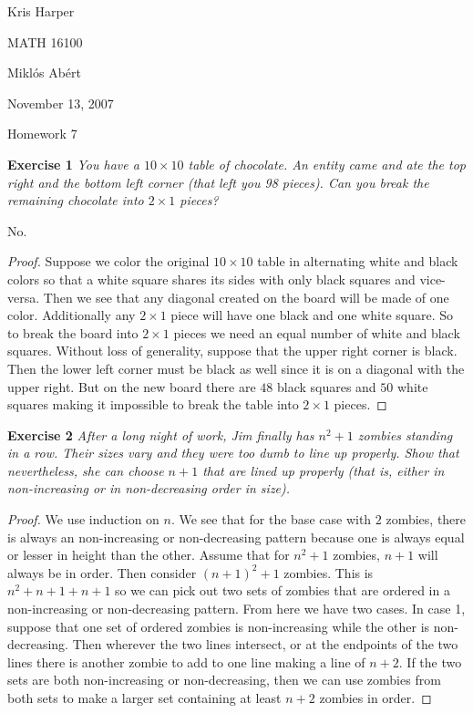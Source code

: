 \documentclass{article}
\begin{document}
\begin{flushright}
Kris Harper

MATH 16100

Mikl\'{o}s Ab\'{e}rt

November 13, 2007
\end{flushright}

\begin{center}
Homework 7
\end{center}

\begin{flushleft}

\textbf{Exercise 1}
\textsl{You have a $10 \times 10$ table of chocolate. An entity came and ate the top right and the bottom left corner (that left you 98 pieces). Can you break the remaining chocolate into $2 \times 1$ pieces?}\newline

No.
\begin{proof}
Suppose we color the original $10 \times 10$ table in alternating white and black colors so that a white square shares its sides with only black squares and vice-versa. Then we see that any diagonal created on the board will be made of one color. Additionally any $2 \times 1$ piece will have one black and one white square. So to break the board into $2 \times 1$ pieces we need an equal number of white and black squares. Without loss of generality, suppose that the upper right corner is black. Then the lower left corner must be black as well since it is on a diagonal with the upper right. But on the new board there are $48$ black squares and $50$ white squares making it impossible to break the table into $2 \times 1$ pieces.
\end{proof}

\textbf{Exercise 2}
\textsl{After a long night of work, Jim finally has $n^2 + 1$ zombies standing in a row. Their sizes vary and they were too dumb to line up properly. Show that nevertheless, she can choose $n + 1$ that are lined up properly (that is, either in non-increasing or in non-decreasing order in size).}
\begin{proof}
We use induction on $n$. We see that for the base case with $2$ zombies, there is always an non-increasing or non-decreasing pattern because one is always equal or lesser in height than the other. Assume that for $n^2+1$ zombies, $n+1$ will always be in order. Then consider $(n+1)^2 +1$ zombies. This is $n^2+n+1+n+1$ so we can pick out two sets of zombies that are ordered in a non-increasing or non-decreasing pattern. From here we have two cases. In case 1, suppose that one set of ordered zombies is non-increasing while the other is non-decreasing. Then wherever the two lines intersect, or at the endpoints of the two lines there is another zombie to add to one line making a line of $n+2$. If the two sets are both non-increasing or non-decreasing, then we can use zombies from both sets to make a larger set containing at least $n+2$ zombies in order.
\end{proof}


\end{flushleft}
\end{document}
